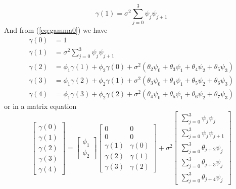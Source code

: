 \documentclass[11pt, oneside]{article}   	%
\begin{document}
\begin{equation}
\gamma(1) =  \sigma^{2}\sum_{j=0}^{3}\psi_{j}\psi_{j+1}
\end{equation}
And from (\ref{eq:gamma0}) we have 
\begin{equation}
\begin{aligned}
\gamma(0) &= 1\\
\gamma(1) &=  \sigma^{2}\sum_{j=0}^{3}\psi_{j}\psi_{j+1}\\
\gamma(2) &= \phi_{1}\gamma(1) + \phi_{2}\gamma(0) + \sigma^{2}(\theta_{2}\psi_{0} + \theta_{3}\psi_{1} + \theta_{4}\psi_{2}+\theta_{5}\psi_{3} )\\
\gamma(3) &= \phi_{1}\gamma(2) + \phi_{2}\gamma(1) + \sigma^{2}(\theta_{3}\psi_{0} + \theta_{4}\psi_{1} + \theta_{5}\psi_{2}+\theta_{6}\psi_{3} )\\
\gamma(4) &= \phi_{1}\gamma(3) + \phi_{2}\gamma(2) + \sigma^{2}(\theta_{4}\psi_{0} + \theta_{5}\psi_{1} + \theta_{6}\psi_{2}+\theta_{7}\psi_{3} )
\end{aligned}
\end{equation}
or in a matrix equation
\begin{equation}
\left[
 \begin{array}{c}
  \gamma(0) \\ \gamma(1)  \\ \gamma(2)  \\ \gamma(3)  \\ \gamma(4)  
  \end{array}
   \right] = 
   \left[ 
   \begin{array}{c}
    \phi_{1} \\ \phi_{2} 
  \end{array}
  \right]
   \begin{bmatrix}
    0 & 0 \\ 0 & 0 \\ \gamma(1) & \gamma(0) \\ \gamma(2) & \gamma(1) \\ \gamma(3) & \gamma(2)
     \end{bmatrix} 
     +\sigma^{2}
     \left[ 
   \begin{array}{c}
    \sum_{j=0}^{3}\psi_{j}\psi_{j} \\  \sum_{j=0}^{3}\psi_{j}\psi_{j+1} \\\sum_{j=0}^{3}\theta_{j+2}\psi_{j}\\\sum_{j=0}^{3}\theta_{j+3}\psi_{j}\\\sum_{j=0}^{3}\theta_{j+4}\psi_{j}
  \end{array}
  \right]
\end{equation}
\end{document}
